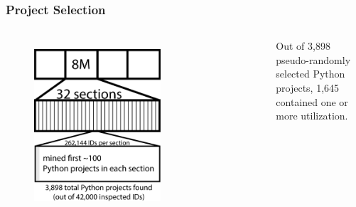 \begin{frame}
\frametitle{Project Selection}
\begin{columns}[t] %
\begin{figure}[ht]
  \includegraphics[scale=0.16]{nontex/illustrations/32Divided.eps}
  \label{fig:32Divided}
\end{figure}
\begin{figure}[ht]
    \label{fig:scraper}
\end{figure}
Out of 3,898 pseudo-randomly selected Python projects, 1,645 contained one or more utilization.
\end{columns}
\end{frame}


